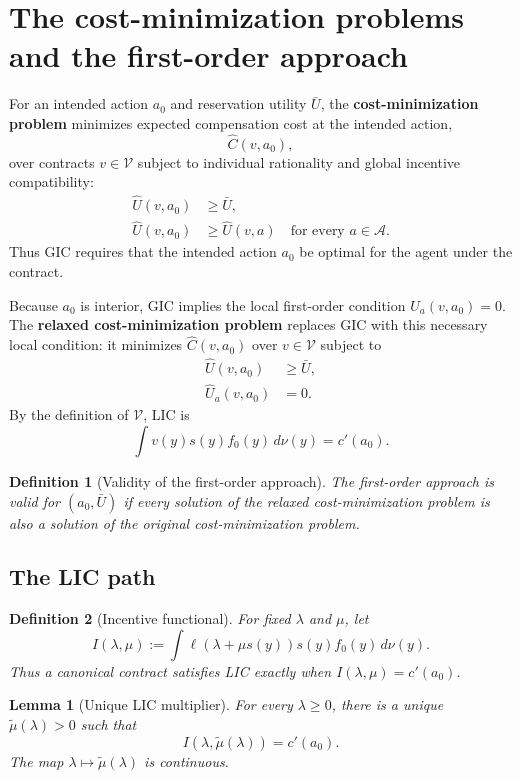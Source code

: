 \documentclass[11pt]{article}
\newtheorem{lemma}{Lemma}
\newtheorem{definition}{Definition}
\theoremstyle{remark}
\newcommand{\dd}{\,d\nu}
\newcommand{\cA}{\mathcal A}
\begin{document}
\section{The cost-minimization problems and the first-order approach}

For an intended action $a_0$ and reservation utility $\bar U$, the
\textbf{cost-minimization problem} minimizes expected compensation cost at the
intended action,
\[
 \widehat C(v,a_0),
\]
over contracts $v\in\mathcal V$ subject to individual rationality and global
incentive compatibility:
\begin{align}
 \widehat U(v,a_0)&\ge \bar U, \tag{IR}\label{eq:IR}\\
 \widehat U(v,a_0)&\ge \widehat U(v,a)
 \quad\text{for every }a\in\cA. \tag{GIC}\label{eq:GIC}
\end{align}
Thus GIC requires that the intended action $a_0$ be optimal for the agent under
the contract.

Because $a_0$ is interior, GIC implies the local first-order condition
$\widehat U_a(v,a_0)=0$.  The \textbf{relaxed cost-minimization problem} replaces
GIC with this necessary local condition: it minimizes $\widehat C(v,a_0)$ over
$v\in\mathcal V$ subject to
\begin{align}
 \widehat U(v,a_0)&\ge \bar U, \tag{IR}\\
 \widehat U_a(v,a_0)&=0. \tag{LIC}\label{eq:LIC}
\end{align}
By the definition of $\mathcal V$, LIC is
\[
 \int v(y)s(y)f_0(y)\dd(y)=c'(a_0).
\]

\begin{definition}[Validity of the first-order approach]
The \emph{first-order approach} is valid for $(a_0,\bar U)$ if every solution of
the relaxed cost-minimization problem is also a solution of the original
cost-minimization problem.
\end{definition}

\subsection{The LIC path}

\begin{definition}[Incentive functional]
For fixed $\lambda$ and $\mu$, let
\[
 I(\lambda,\mu):=
 \int \ell(\lambda+\mu s(y))s(y)f_0(y)\dd(y).
\]
Thus a canonical contract satisfies LIC exactly when
$I(\lambda,\mu)=c'(a_0)$.
\end{definition}

\begin{lemma}[Unique LIC multiplier]
\label{lem:unique-mu}
For every $\lambda\ge0$, there is a unique $\widetilde\mu(\lambda)>0$ such that
\[
 I(\lambda,\widetilde\mu(\lambda))=c'(a_0).
\]
The map $\lambda\mapsto\widetilde\mu(\lambda)$ is continuous.
\end{lemma}
\end{document}
